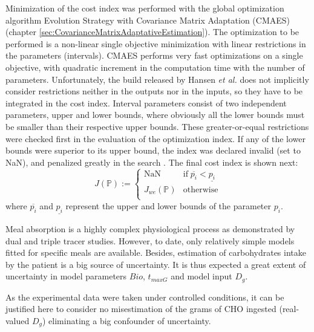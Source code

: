 Minimization of the cost index was performed with the global optimization algorithm Evolution Strategy with Covariance Matrix Adaptation (CMAES) (chapter \ref{sec:CovarianceMatrixAdaptativeEstimation}). The optimization to be performed is a non-linear single objective minimization with linear restrictions in the parameters (intervals). CMAES performs very fast optimizations on a single objective, with quadratic increment in the computation time with the number of parameters. Unfortunately, the build released by Hansen \textit{et al.} \cite{hansen2004evaluating} does not implicitly consider restrictions neither in the outputs nor in the inputs, so they have to be integrated in the cost index. Interval parameters consist of two independent parameters, upper and lower bounds, where obviously all the lower bounds must be smaller than their respective upper bounds. These greater-or-equal restrictions were checked first in the evaluation of the optimization index. If any of the lower bounds were superior to its upper bound, the index was declared invalid (set to NaN), and penalized greatly in the search \cite{hansen2004evaluating}. The final cost index is shown next:
\begin{equation}
J(\mathbb{P}):= \begin{cases}
\text{NaN} & \text{if} \; \overline{p_i} < \underline{p_i} \\
J_{we}(\mathbb{P}) & \text{otherwise}\\
\end{cases}
\label{eq:totalindex}
\end{equation}	
where $\overline{p_i}$ and $\underline{p_i}$ represent the upper and lower bounds of the parameter $p_i$. 

Meal absorption is a highly complex physiological process as demonstrated by dual and triple tracer studies. However, to date, only relatively simple models fitted for specific meals are available. Besides, estimation of carbohydrates intake by the patient is a big source of uncertainty. It is thus expected a great extent of uncertainty in model parameters $Bio$, $t_{maxG}$ and model input $D_g$.

As the experimental data were taken under controlled conditions, it can be justified here to consider no misestimation of the grams of CHO ingested (real-valued $D_g$) eliminating a big confounder of uncertainty.

